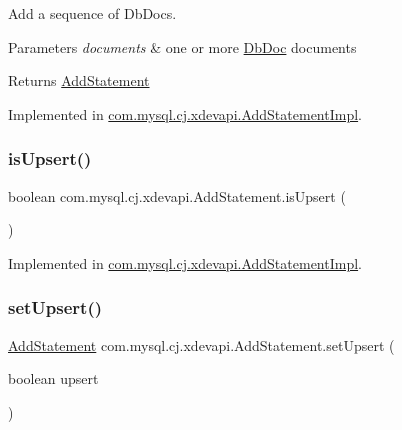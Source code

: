 Add a sequence of Db\+Docs.


\begin{DoxyParams}{Parameters}
{\em documents} & one or more \mbox{\hyperlink{interfacecom_1_1mysql_1_1cj_1_1xdevapi_1_1_db_doc}{Db\+Doc}} documents \\
\hline
\end{DoxyParams}
\begin{DoxyReturn}{Returns}
\mbox{\hyperlink{interfacecom_1_1mysql_1_1cj_1_1xdevapi_1_1_add_statement}{Add\+Statement}} 
\end{DoxyReturn}


Implemented in \mbox{\hyperlink{classcom_1_1mysql_1_1cj_1_1xdevapi_1_1_add_statement_impl_a59bdfcc8a26ee55966f9a1ad5a7b2303}{com.\+mysql.\+cj.\+xdevapi.\+Add\+Statement\+Impl}}.

\mbox{\label{interfacecom_1_1mysql_1_1cj_1_1xdevapi_1_1_add_statement_a22f74388f89be049d0f1c591e143874c}} 
\subsubsection{\texorpdfstring{is\+Upsert()}{isUpsert()}}
{\footnotesize\ttfamily boolean com.\+mysql.\+cj.\+xdevapi.\+Add\+Statement.\+is\+Upsert (\begin{DoxyParamCaption}{ }\end{DoxyParamCaption})}



Implemented in \mbox{\hyperlink{classcom_1_1mysql_1_1cj_1_1xdevapi_1_1_add_statement_impl_ac138d6c3ba88d8d8b1d90703decb0908}{com.\+mysql.\+cj.\+xdevapi.\+Add\+Statement\+Impl}}.

\mbox{\label{interfacecom_1_1mysql_1_1cj_1_1xdevapi_1_1_add_statement_ab2681842a71332f6170cb5b227ff6ebd}} 
\subsubsection{\texorpdfstring{set\+Upsert()}{setUpsert()}}
{\footnotesize\ttfamily \mbox{\hyperlink{interfacecom_1_1mysql_1_1cj_1_1xdevapi_1_1_add_statement}{Add\+Statement}} com.\+mysql.\+cj.\+xdevapi.\+Add\+Statement.\+set\+Upsert (\begin{DoxyParamCaption}\item[{boolean}]{upsert }\end{DoxyParamCaption})}



